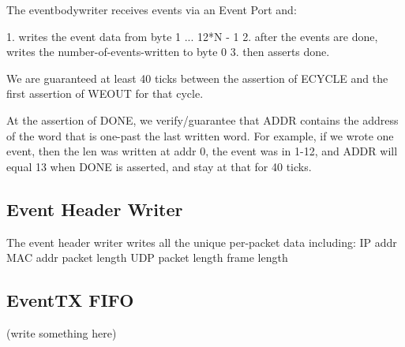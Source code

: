The eventbodywriter receives events via an Event Port and: 

1. writes the event data from byte 1 ... 12*N - 1
2. after the events are done, writes the number-of-events-written to byte 0
3. then asserts done. 

We are guaranteed at least 40 ticks between the assertion of ECYCLE
and the first assertion of WEOUT for that cycle. 

At the assertion of DONE, we verify/guarantee that ADDR contains the
address of the word that is one-past the last written word. For
example, if we wrote one event, then the len was written at addr 0,
the event was in 1-12, and ADDR will equal 13 when DONE is asserted,
and stay at that for 40 ticks.

\subsection{Event Header Writer}
The event header writer writes all the unique per-packet data including: 
IP addr
MAC addr
packet length
UDP packet length
frame length

\subsection{EventTX FIFO}
(write something here)

